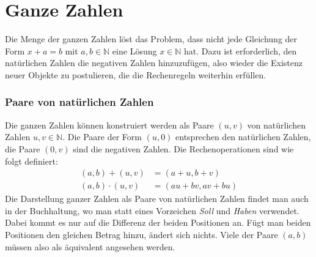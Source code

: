 %
%
%
\section{Ganze Zahlen
\label{buch:section:ganze-zahlen}}
Die Menge der ganzen Zahlen löst das Problem, dass nicht jede
Gleichung der Form $x+a=b$ mit $a, b \in \mathbb N$
eine Lösung $x \in \mathbb N$ hat.
Dazu ist erforderlich, den natürlichen Zahlen die negativen Zahlen
hinzuzufügen, also wieder die Existenz neuer Objekte zu postulieren,
die die Rechenregeln weiterhin erfüllen.

\subsubsection{Paare von natürlichen Zahlen}
Die ganzen Zahlen können konstruiert werden als Paare $(u,v)$ von 
natürlichen Zahlen $u,v\in\mathbb{N}$.
Die Paare der Form $(u,0)$ entsprechen den natürlichen Zahlen, die
Paare $(0,v)$ sind die negativen Zahlen.
Die Rechenoperationen sind wie folgt definiert:
\begin{equation}
\begin{aligned}
(a,b)+(u,v) &= (a+u,b+v)
\\
(a,b)\cdot (u,v) &= (au+bv,av+bu)
\end{aligned}
\label{buch:zahlen:ganze-rechenregeln}
\end{equation}
Die Darstellung ganzer Zahlen als Paare von natürlichen Zahlen
findet man auch in der Buchhaltung, wo man statt eines Vorzeichen
{\em Soll} und {\em Haben} verwendet.
%
Dabei kommt es nur auf die Differenz der beiden Positionen an.
Fügt man beiden Positionen den gleichen Betrag hinzu, ändert sich
nichts.
Viele der Paare $(a,b)$ müssen also als äquivalent angesehen
werden.

